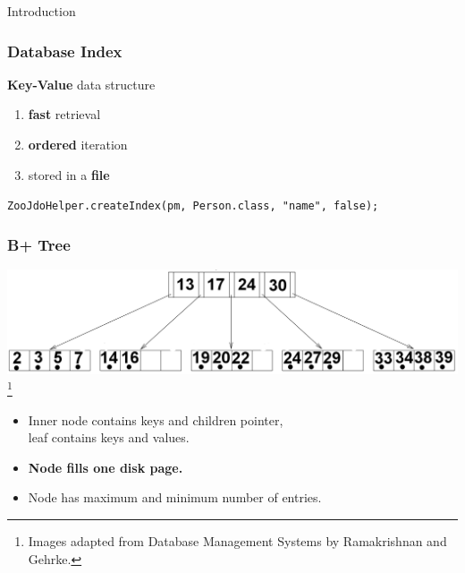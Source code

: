 \documentclass{beamer}
\newcommand\blfootnote[1]{%
  \begingroup
  \renewcommand\thefootnote{}\footnote{#1}%
  \addtocounter{footnote}{-1}%
  \endgroup
}
\begin{document}
\begin{section}{Introduction}
\begin{frame}
    \end{frame}
    \begin{frame}
      \frametitle{Database Index}
      \begin{block}{}
        \textbf{Key-Value} data structure \\
        \begin{enumerate}
        \item \textbf{fast} retrieval 
        \item \textbf{ordered} iteration
        \item stored in a \textbf{file}
        \end{enumerate}
      \end{block}
      \vspace{1em}
      \pause
      \texttt{ZooJdoHelper.createIndex(pm, Person.class, "name", false);}
      \pause
      \begin{center}
      \pause
      \end{center}
    \end{frame}

    \begin{frame}
      \frametitle{B+ Tree}
      \pause
      \vspace{-1em}
      \includegraphics[scale=0.2]{B+Tree.png}
      \blfootnote{\tiny Images adapted from Database Management Systems by Ramakrishnan and Gehrke.}
      \vspace{2em}
      \begin{itemize}
        \item Inner node contains keys and children pointer, \\leaf contains keys and values.
        \pause
        \item \textbf{Node fills one disk page.}
        \pause
        \item Node has maximum and minimum number of entries.
      \end{itemize}
    \end{frame}


\end{section}
\end{document}
